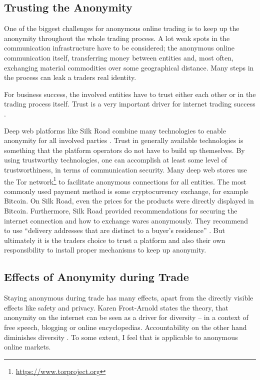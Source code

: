 \subsection{Trusting the Anonymity}

One of the biggest challenges for anonymous online trading is to keep up the anonymity throughout the whole trading process. A lot weak spots in the communication infrastructure have to be considered; the anonymous online communication itself, transferring money between entities and, most often, exchanging material commodities over some geographical distance. Many steps in the process can leak a traders real identity.

For business success, the involved entities have to trust either each other or in the trading process itself. Trust is a very important driver for internet trading success \cite{internetTrust2004}.

Deep web platforms like Silk Road combine many technologies to enable anonymity for all involved parties \cite{silkroad2013}. Trust in generally available technologies is something that the platform operators do not have to build up themselves. By using trustworthy technologies, one can accomplish at least some level of trustworthiness, in terms of communication security. Many deep web stores use the Tor network\footnote{\url{https://www.torproject.org}} to facilitate anonymous connections for all entities\cite{silkroad2013}. The most commonly used payment method is some cryptocurrency exchange, for example Bitcoin. On Silk Road, even the prices for the products were directly displayed in Bitcoin. Furthermore, Silk Road provided recommendations for securing the internet connection and how to exchange wares anonymously. They recommend to use ``delivery addresses that are distinct to a buyer's residence'' \cite{silkroad2013}. But ultimately it is the traders choice to trust a platform and also their own responsibility to install proper mechanisms to keep up anonymity.

\subsection{Effects of Anonymity during Trade}

Staying anonymous during trade has many effects, apart from the directly visible effects like safety and privacy. Karen Frost-Arnold \cite{accountability2014} states the theory, that anonymity on the internet can be seen as a driver for diversity -- in a context of free speech, blogging or online encyclopedias. Accountability on the other hand diminishes diversity \cite{accountability2014}. To some extent, I feel that is applicable to anonymous online markets.

